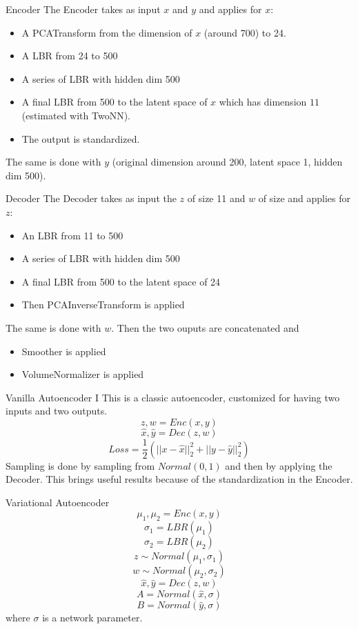 \documentclass{beamer}
\begin{document}
\begin{frame}{Encoder}
The Encoder takes as input $x$ and $y$ and applies for $x$:
\begin{itemize}
\item A PCATransform from the dimension of $x$ (around 700) to 24.
\item A LBR from 24 to 500
\item A series of LBR with hidden dim 500
\item A final LBR from 500 to the latent space of $x$ which has dimension $11$ (estimated with TwoNN). 
\item The output is standardized.
\end{itemize}
The same is done with $y$ (original dimension around 200,  latent space 1, hidden dim 500).
\end{frame}
\begin{frame}{Decoder}
The Decoder takes as input the  $z$ of size 11 and $w$ of size and applies for $z$:
\begin{itemize}
\item An  LBR from 11 to 500
\item A series of LBR with hidden dim 500
\item A final LBR from 500 to the latent space of 24
\item Then PCAInverseTransform is applied
\end{itemize}
The same is done with $w$. 
Then the two ouputs are concatenated and 
\begin{itemize}
\item Smoother is applied
\item VolumeNormalizer is applied
\end{itemize}
\end{frame}
\begin{frame}{Vanilla Autoencoder I}
This is a classic autoencoder, customized for having two inputs and two outputs.
$$z,w=Enc(x,y)$$
$$\hat{x},\hat{y}=Dec(z,w)$$
$$Loss=\frac{1}{2}(||x-\hat{x}||_{2}^{2}+||y-\hat{y}||_{2}^{2})$$
Sampling is done by sampling from $Normal(0,1)$  and then by applying the Decoder. This brings useful results because of the standardization in the Encoder.
\end{frame}
\begin{frame}{Variational Autoencoder}
$$\mu_{1},\mu_{2}=Enc(x,y)$$
$$\sigma_{1}=LBR(\mu_{1})$$
$$\sigma_{2}=LBR(\mu_{2})$$
$$z\sim Normal(\mu_{1},\sigma_{1})$$
$$w\sim Normal(\mu_{2},\sigma_{2})$$
$$\hat{x},\hat{y}=Dec(z,w)$$
$$A=Normal(\hat{x},\sigma)$$
$$B=Normal(\hat{y},\sigma)$$
where $\sigma$ is a network parameter.
\end{frame}
\end{document}
